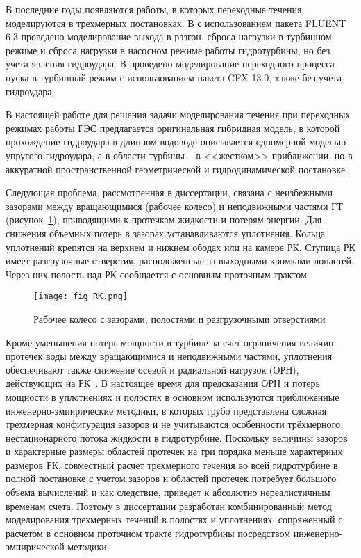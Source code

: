 В последние годы появляются работы, в которых переходные течения моделируются в трехмерных 
постановках. В \cite{Li,Liu1,Liu2} с использованием пакета FLUENT 6.3 
проведено моделирование выхода в разгон, сброса нагрузки в турбинном режиме и сброса нагрузки в 
насосном режиме работы гидротурбины, но без учета явления гидроудара. 
В \cite{Nicolle} проведено моделирование переходного процесса пуска в турбинный режим 
с использованием пакета CFX 13.0, также без учета гидроудара. 

В настоящей работе для решения задачи моделирования течения при переходных режимах работы ГЭС 
предлагается оригинальная гибридная модель, в которой прохождение гидроудара в длинном водоводе описывается 
одномерной моделью упругого гидроудара, а в области турбины -- в <<жестком>> приближении, но в 
аккуратной пространственной геометрической и гидродинамической постановке.

Следующая проблема, рассмотренная в диссертации, связана с неизбежными зазорами между вращающимися 
(рабочее колесо) и неподвижными частями ГТ (рисунок~\ref{fig:01}), приводящими к протечкам жидкости и 
потерям энергии. Для снижения объемных потерь в зазорах устанавливаются уплотнения. 
Кольца уплотнений крепятся на верхнем и нижнем ободах или на камере РК. Ступица 
РК имеет разгрузочные отверстия, расположенные за выходными кромками лопастей. Через них полость
над РК сообщается с основным проточным трактом.

\begin{figure}[ht!]
  \label{fig:01}
  \centering
  \texttt{[image: fig\_RK.png]}%
  \caption{Рабочее колесо с зазорами, полостями и разгрузочными отверстиями}
\end{figure}

Кроме уменьшения потерь мощности в турбине за счет ограничения величин протечек воды между вращающимися и 
неподвижными частями, уплотнения обеспечивают также снижение осевой и радиальной нагрузок (ОРН), 
действующих на РК~\cite{granovsky}. В настоящее время для предсказания ОРН и потерь мощности в уплотнениях 
и полостях в основном используются приближённые инженерно-эмпирические методики, в которых грубо
представлена сложная трехмерная конфигурация зазоров и не учитываются особенности трёхмерного 
нестационарного потока жидкости в гидротурбине. 
Поскольку величины зазоров и характерные размеры областей протечек на три порядка меньше характерных
размеров РК, совместный расчет трехмерного течения во всей гидротурбине в полной постановке с учетом зазоров 
и областей протечек потребует большого объема вычислений и как следствие, приведет к абсолютно 
нереалистичным временам счета. Поэтому в диссертации разработан комбинированный метод 
моделирования трехмерных течений в полостях и уплотнениях, сопряженный с расчетом в основном проточном тракте 
гидротурбины посредством инженерно-эмпирической методики. 

